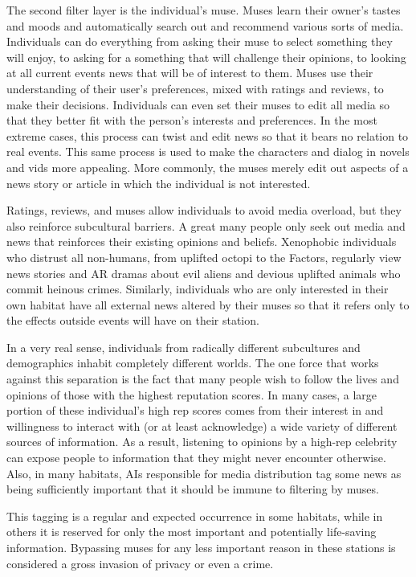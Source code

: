 The second filter layer is the individual's muse.  Muses learn their
owner's tastes and moods and automatically search out and recommend
various sorts of media. Individuals can do everything from asking
their muse to select something they will enjoy, to asking for a
something that will challenge their opinions, to looking at all
current events news that will be of interest to them. Muses use their
understanding of their user's preferences, mixed with ratings and
reviews, to make their decisions. Individuals can even set their muses
to edit all media so that they better fit with the person's interests
and preferences. In the most extreme cases, this process can twist and
edit news so that it bears no relation to real events. This same
process is used to make the characters and dialog in novels and vids
more appealing. More commonly, the muses merely edit out aspects of a
news story or article in which the individual is not interested.

Ratings, reviews, and muses allow individuals to avoid media overload,
but they also reinforce subcultural barriers. A great many people only
seek out media and news that reinforces their existing opinions and
beliefs. Xenophobic individuals who distrust all non-humans, from
uplifted octopi to the Factors, regularly view news stories and AR
dramas about evil aliens and devious uplifted animals who commit
heinous crimes. Similarly, individuals who are only interested in
their own habitat have all external news altered by their muses so
that it refers only to the effects outside events will have on their
station.

In a very real sense, individuals from radically different subcultures
and demographics inhabit completely different worlds. The one force
that works against this separation is the fact that many people wish
to follow the lives and opinions of those with the highest reputation
scores. In many cases, a large portion of these individual's high rep
scores comes from their interest in and willingness to interact with
(or at least acknowledge) a wide variety of different sources of
information. As a result, listening to opinions by a high-rep
celebrity can expose people to information that they might never
encounter otherwise.  Also, in many habitats, AIs responsible for
media distribution tag some news as being sufficiently important that
it should be immune to filtering by muses.

This tagging is a regular and expected occurrence in some habitats,
while in others it is reserved for only the most important and
potentially life-saving information. Bypassing muses for any less
important reason in these stations is considered a gross invasion of
privacy or even a crime.

